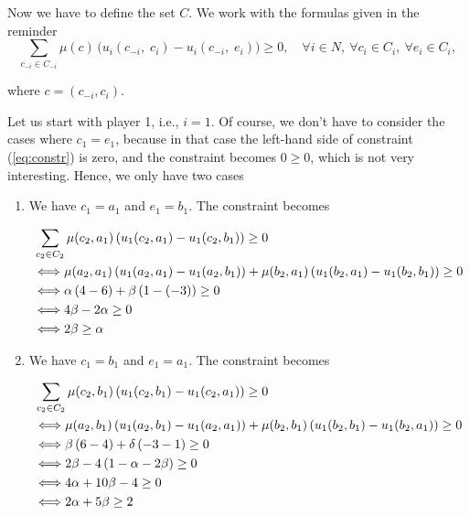 Now we have to define the set $C$. We work with the formulas given in the reminder
\begin{equation}
\label{eq:constr}
	\sum_{c_{-i} \in C_{-i}} \mu(c) \, \big( u_i(c_{-i}, \; c_i) - u_i(c_{-i}, \; e_i) \big) \geq 0, \quad \forall i \in N, \ \forall c_i \in C_i, \ \forall e_i \in C_i,
\end{equation}

where $c = (c_{-i}, c_i)$.

Let us start with player 1, i.e., $i=1$. Of course, we don't have to consider the cases where $c_1 = e_1$, because in that case the left-hand side of constraint (\ref{eq:constr}) is zero, and the constraint becomes $0 \geq 0$, which is not very interesting. Hence, we only have two cases
\begin{enumerate}
    \item We have $c_1 = a_1$ and $e_1 = b_1$. The constraint becomes

    \begin{align*}
    & \sum_{c_{2} \in C_{2}} \mu(c_2,a_1) \left( u_1(c_{2}, a_1) - u_1(c_{2}, b_1) \right) \geq 0 \\
    & \Longleftrightarrow
    \mu(a_2,a_1) \left( u_1(a_{2}, a_1) - u_1(a_{2}, b_1) \right)
    +
    \mu(b_2,a_1) \left( u_1(b_{2}, a_1) - u_1(b_{2}, b_1) \right)
    \geq 0 \\
    & \Longleftrightarrow
    \alpha \left( 4 - 6 \right)
    +
    \beta \left( 1 - (-3) \right)
    \geq 0 \\
    & \Longleftrightarrow
    4 \beta - 2 \alpha
    \geq 0 \\
    & \Longleftrightarrow
    2 \beta \geq \alpha  \\
    \end{align*}

    \item We have $c_1 = b_1$ and $e_1 = a_1$. The constraint becomes

    \begin{align*}
    & \sum_{c_{2} \in C_{2}} \mu(c_2,b_1) \left( u_1(c_{2}, b_1) - u_1(c_{2}, a_1) \right) \geq 0 \\
    & \Longleftrightarrow
    \mu(a_2,b_1) \left( u_1(a_{2}, b_1) - u_1(a_{2}, a_1) \right)
    +
    \mu(b_2,b_1) \left( u_1(b_{2}, b_1) - u_1(b_{2}, a_1) \right)
    \geq 0 \\
    & \Longleftrightarrow
    \beta \left( 6 - 4 \right)
    +
    \delta \left( - 3 - 1 \right)
    \geq 0 \\
    & \Longleftrightarrow
    2 \beta
    -
    4 \left( 1 - \alpha - 2 \beta\right)
    \geq 0 \\
    & \Longleftrightarrow
    4 \alpha + 10 \beta - 4
    \geq 0 \\
    & \Longleftrightarrow
    2 \alpha + 5 \beta \geq 2 \\
    \end{align*}

\end{enumerate}

